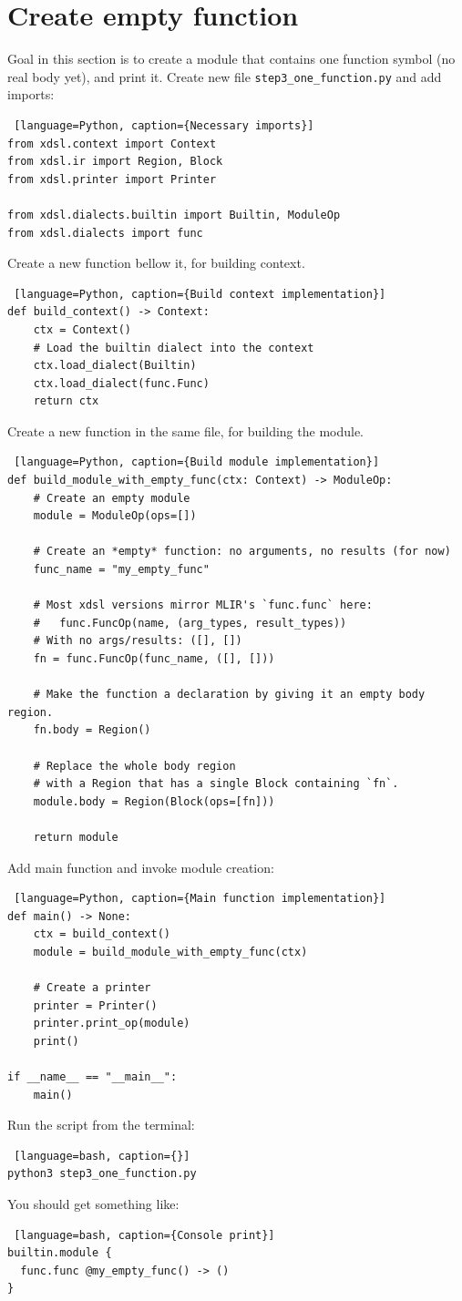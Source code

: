 \documentclass[../main.tex]{subfiles}
\begin{document}
\section{Create empty function}
Goal in this section is to create a module that contains one function symbol (no real body yet), and print it.
Create new file \texttt{step3\_one\_function.py} and add imports:
\begin{lstlisting} [language=Python, caption={Necessary imports}]
from xdsl.context import Context
from xdsl.ir import Region, Block
from xdsl.printer import Printer

from xdsl.dialects.builtin import Builtin, ModuleOp
from xdsl.dialects import func
\end{lstlisting}
Create a new function bellow it, for building context.
\begin{lstlisting} [language=Python, caption={Build context implementation}]
def build_context() -> Context:
    ctx = Context()
    # Load the builtin dialect into the context
    ctx.load_dialect(Builtin)
    ctx.load_dialect(func.Func)
    return ctx
\end{lstlisting}

Create a new function in the same file, for building the module.
\begin{lstlisting} [language=Python, caption={Build module implementation}]
def build_module_with_empty_func(ctx: Context) -> ModuleOp:
    # Create an empty module
    module = ModuleOp(ops=[])

    # Create an *empty* function: no arguments, no results (for now)
    func_name = "my_empty_func"

    # Most xdsl versions mirror MLIR's `func.func` here:
    #   func.FuncOp(name, (arg_types, result_types))
    # With no args/results: ([], [])
    fn = func.FuncOp(func_name, ([], []))

    # Make the function a declaration by giving it an empty body region.
    fn.body = Region()

    # Replace the whole body region
    # with a Region that has a single Block containing `fn`.
    module.body = Region(Block(ops=[fn]))

    return module
\end{lstlisting}
Add main function and invoke module creation:
\begin{lstlisting} [language=Python, caption={Main function implementation}]
def main() -> None:
    ctx = build_context()
    module = build_module_with_empty_func(ctx)

    # Create a printer
    printer = Printer()
    printer.print_op(module)
    print()

if __name__ == "__main__":
    main()
\end{lstlisting}
Run the script from the terminal:
\begin{lstlisting} [language=bash, caption={}]
python3 step3_one_function.py
\end{lstlisting}
You should get something like:
\begin{lstlisting} [language=bash, caption={Console print}]
builtin.module {
  func.func @my_empty_func() -> ()
}
\end{lstlisting}
\end{document}

